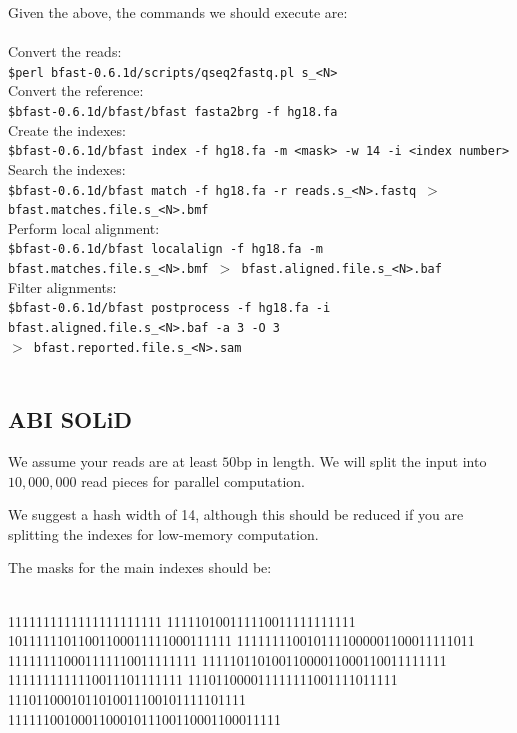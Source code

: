 \documentclass[a4paper,12pt]{book}
\newcommand{\Version}{0.6.1d}
\begin{document}
Given the above, the commands we should execute are:
\\\\
Convert the reads:\\
{\tt \scriptsize \$perl bfast-\Version{}/scripts/qseq2fastq.pl s\_<N>\\}
Convert the reference:\\
{\tt \scriptsize \$bfast-\Version{}/bfast/bfast fasta2brg -f hg18.fa\\}
Create the indexes:\\
{\tt \scriptsize \$bfast-\Version{}/bfast index -f hg18.fa -m <mask> -w 14 -i <index number>\\}
Search the indexes:\\
{\tt \scriptsize \$bfast-\Version{}/bfast match -f hg18.fa -r reads.s\_<N>.fastq $>$ bfast.matches.file.s\_<N>.bmf\\}
Perform local alignment:\\
{\tt \scriptsize \$bfast-\Version{}/bfast localalign -f hg18.fa -m bfast.matches.file.s\_<N>.bmf $>$ bfast.aligned.file.s\_<N>.baf\\}
Filter alignments:\\
{\tt \scriptsize \$bfast-\Version{}/bfast postprocess -f hg18.fa -i bfast.aligned.file.s\_<N>.baf -a 3 -O 3 \\
$>$ bfast.reported.file.s\_<N>.sam\\}
\\

\subsection{ABI SOLiD}
\label{sec:hg-settings-abi}
We assume your reads are at least $50$bp in length.
We will split the input into $10,000,000$ read pieces for parallel computation.

We suggest a hash width of 14, although this should be reduced if you are splitting the indexes for low-memory computation.

The masks for the main indexes should be:\\
\\
\begin{boxedverbatim}
1111111111111111111111
111110100111110011111111111
10111111011001100011111000111111
1111111100101111000001100011111011
111111110001111110011111111
11111011010011000011000110011111111
1111111111110011101111111
111011000011111111001111011111
1110110001011010011100101111101111
111111001000110001011100110001100011111
\end{boxedverbatim}
\\
\end{document}
